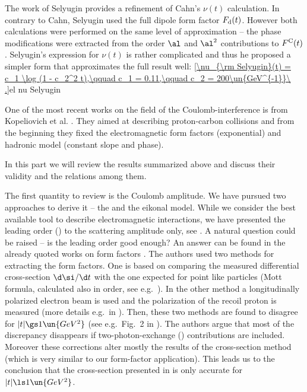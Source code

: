 The work of Selyugin  provides a refinement of Cahn's $\nu(t)$ calculation. In contrary to Cahn, Selyugin used the full dipole form factor $F_{\rm d}(t)$. However both calculations were performed on the same level of approximation -- the phase modifications were extracted from the order $\al$ and $\al^2$ contributions to $F^{\rm C}(t)$. Selyugin's expression for $\nu(t)$ is rather complicated and thus he proposed a simpler form that approximates the full result well:
\eqref{\nu_{\rm Selyugin}(t) = c_1 \log (1 - c_2^2 t),\qquad c_1 = 0.11,\qquad c_2 = 200\un{GeV^{-1}}\ .}{el nu Selyugin}

One of the most recent works on the field of the Coulomb-interference is from Kopeliovich et al. . They aimed at describing proton-carbon collisions and from the beginning they fixed the electromagnetic form factors (exponential) and hadronic model (constant slope and phase).


In this part we will review the results summarized above and discuss their validity and the relations among them.


The first quantity to review is the Coulomb amplitude. We have pursued two approaches to derive it -- the  and the eikonal model. While we consider  the best available tool to describe electromagnetic interactions, we have presented the leading order () to the scattering amplitude only, see . A natural question could be raised -- is the leading order good enough? An answer can be found in the already quoted works on form factors . The authors used two methods for extracting the form factors. One is based on comparing the measured differential cross-section $\d\si/\d t$ with the one expected for point like particles (Mott formula, calculated also in  order, see e.g.~). In the other method a longitudinally polarized electron beam is used and the polarization of the recoil proton is measured (more details e.g.~in ). Then, these two methods are found to disagree for $|t| \gs 1\un{GeV^2}$ (see e.g.~Fig.~2 in ). The authors argue that most of the discrepancy disappears if two-photon-exchange () contributions are included. Moreover these corrections alter mostly the results of the cross-section method (which is very similar to our form-factor application). This leads us to the conclusion that the  cross-section presented in  is only accurate for $|t| \ls 1\un{GeV^2}$.

